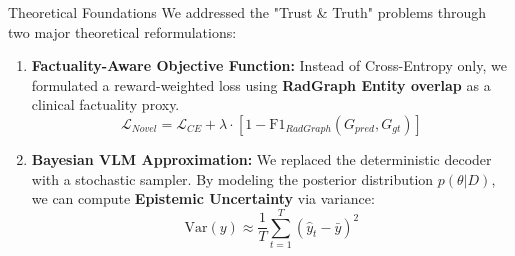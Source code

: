 \documentclass[aspectratio=169]{beamer}
\begin{document}
\begin{frame}{Theoretical Foundations}
  We addressed the "Trust \& Truth" problems through two major theoretical reformulations:
  \vspace{0.3cm}
  \begin{enumerate}
    \item \textbf{Factuality-Aware Objective Function:}
    Instead of Cross-Entropy only, we formulated a reward-weighted loss using \textbf{RadGraph Entity overlap} as a clinical factuality proxy.
    \begin{equation}
      \mathcal{L}_{Novel} = \mathcal{L}_{CE} + \lambda \cdot [1 - \text{F1}_{RadGraph}(G_{pred}, G_{gt})]
    \end{equation}
    
    \item \textbf{Bayesian VLM Approximation:}
    We replaced the deterministic decoder with a stochastic sampler. By modeling the posterior distribution $p(\theta|D)$, we can compute \textbf{Epistemic Uncertainty} via variance:
    \begin{equation}
      \text{Var}(y) \approx \frac{1}{T} \sum_{t=1}^{T} (\hat{y}_t - \bar{y})^2
    \end{equation}
  \end{enumerate}
\end{frame}
\end{document}
